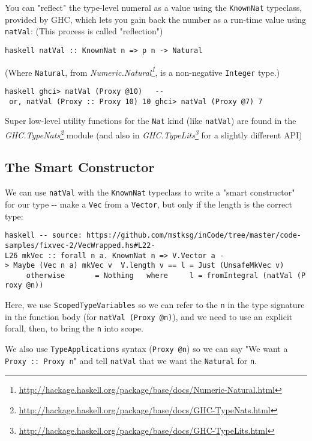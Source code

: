 \documentclass[]{article}
\renewcommand{\href}[2]{#2\footnote{\url{#1}}}
\begin{document}
You can "reflect" the type-level numeral as a value using the \texttt{KnownNat}
typeclass, provided by GHC, which lets you gain back the number as a run-time
value using \texttt{natVal}: (This process is called "reflection")

\texttt{haskell\ natVal\ ::\ KnownNat\ n\ =\textgreater{}\ p\ n\ -\textgreater{}\ Natural}

(Where \texttt{Natural}, from
\emph{\href{http://hackage.haskell.org/package/base/docs/Numeric-Natural.html}{Numeric.Natural}},
is a non-negative \texttt{Integer} type.)

\texttt{haskell\ ghci\textgreater{}\ natVal\ (Proxy\ @10)\ \ \ -\/-\ or,\ natVal\ (Proxy\ ::\ Proxy\ 10)\ 10\ ghci\textgreater{}\ natVal\ (Proxy\ @7)\ 7}

Super low-level utility functions for the \texttt{Nat} kind (like
\texttt{natVal}) are found in the
\emph{\href{http://hackage.haskell.org/package/base/docs/GHC-TypeNats.html}{GHC.TypeNats}}
module (and also in
\emph{\href{http://hackage.haskell.org/package/base/docs/GHC-TypeLits.html}{GHC.TypeLits}}
for a slightly different API)

\subsection{The Smart Constructor}

We can use \texttt{natVal} with the \texttt{KnownNat} typeclass to write a
"smart constructor" for our type -\/- make a \texttt{Vec} from a
\texttt{Vector}, but only if the length is the correct type:

\texttt{haskell\ -\/-\ source:\ https://github.com/mstksg/inCode/tree/master/code-samples/fixvec-2/VecWrapped.hs\#L22-L26\ mkVec\ ::\ forall\ n\ a.\ KnownNat\ n\ =\textgreater{}\ V.Vector\ a\ -\textgreater{}\ Maybe\ (Vec\ n\ a)\ mkVec\ v\ \textbar{}\ V.length\ v\ ==\ l\ =\ Just\ (UnsafeMkVec\ v)\ \ \ \ \ \ \ \ \ \textbar{}\ otherwise\ \ \ \ \ \ \ =\ Nothing\ \ \ where\ \ \ \ \ l\ =\ fromIntegral\ (natVal\ (Proxy\ @n))}

Here, we use \texttt{ScopedTypeVariables} so we can refer to the \texttt{n} in
the type signature in the function body (for \texttt{natVal\ (Proxy\ @n)}), and
we need to use an explicit forall, then, to bring the \texttt{n} into scope.

We also use \texttt{TypeApplications} syntax (\texttt{Proxy\ @n}) so we can say
"We want a \texttt{Proxy\ ::\ Proxy\ n}" and tell \texttt{natVal} that we want
the \texttt{Natural} for \texttt{n}.
\end{document}
